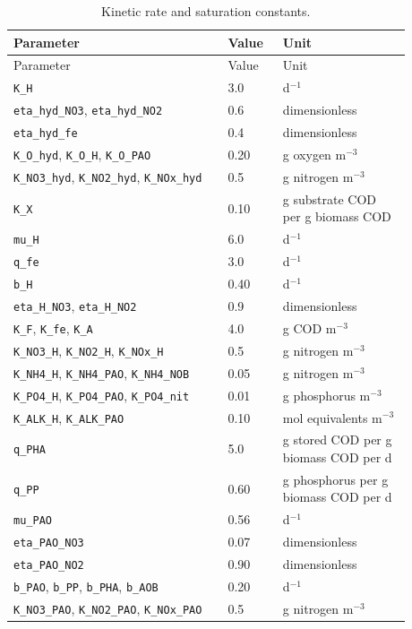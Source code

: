 \documentclass[a4paper,fleqn]{cas-sc}
\begin{document}
\begin{longtable}{p{0.47\linewidth}p{0.12\linewidth}p{0.29\linewidth}}
\caption{Kinetic rate and saturation constants.}\label{tab:Skinetics}\\
\toprule
Parameter & Value & Unit\\
\midrule
\endfirsthead
\toprule
Parameter & Value & Unit\\
\midrule
\endhead
\texttt{K\_H} & 3.0 & d$^{-1}$\\
\texttt{eta\_hyd\_NO3}, \texttt{eta\_hyd\_NO2} & 0.6 & dimensionless\\
\texttt{eta\_hyd\_fe} & 0.4 & dimensionless\\
\texttt{K\_O\_hyd}, \texttt{K\_O\_H}, \texttt{K\_O\_PAO} & 0.20 & g oxygen m$^{-3}$\\
\texttt{K\_NO3\_hyd}, \texttt{K\_NO2\_hyd}, \texttt{K\_NOx\_hyd} & 0.5 & g nitrogen m$^{-3}$\\
\texttt{K\_X} & 0.10 & g substrate COD per g biomass COD\\
\texttt{mu\_H} & 6.0 & d$^{-1}$\\
\texttt{q\_fe} & 3.0 & d$^{-1}$\\
\texttt{b\_H} & 0.40 & d$^{-1}$\\
\texttt{eta\_H\_NO3}, \texttt{eta\_H\_NO2} & 0.9 & dimensionless\\
\texttt{K\_F}, \texttt{K\_fe}, \texttt{K\_A} & 4.0 & g COD m$^{-3}$\\
\texttt{K\_NO3\_H}, \texttt{K\_NO2\_H}, \texttt{K\_NOx\_H} & 0.5 & g nitrogen m$^{-3}$\\
\texttt{K\_NH4\_H}, \texttt{K\_NH4\_PAO}, \texttt{K\_NH4\_NOB} & 0.05 & g nitrogen m$^{-3}$\\
\texttt{K\_PO4\_H}, \texttt{K\_PO4\_PAO}, \texttt{K\_PO4\_nit} & 0.01 & g phosphorus m$^{-3}$\\
\texttt{K\_ALK\_H}, \texttt{K\_ALK\_PAO} & 0.10 & mol equivalents m$^{-3}$\\
\texttt{q\_PHA} & 5.0 & g stored COD per g biomass COD per d\\
\texttt{q\_PP} & 0.60 & g phosphorus per g biomass COD per d\\
\texttt{mu\_PAO} & 0.56 & d$^{-1}$\\
\texttt{eta\_PAO\_NO3} & 0.07 & dimensionless\\
\texttt{eta\_PAO\_NO2} & 0.90 & dimensionless\\
\texttt{b\_PAO}, \texttt{b\_PP}, \texttt{b\_PHA}, \texttt{b\_AOB} & 0.20 & d$^{-1}$\\
\texttt{K\_NO3\_PAO}, \texttt{K\_NO2\_PAO}, \texttt{K\_NOx\_PAO} & 0.5 & g nitrogen m$^{-3}$\\

\end{longtable}
\end{document}
